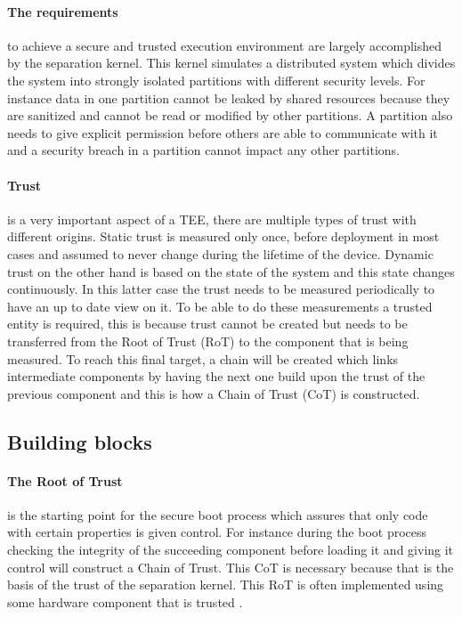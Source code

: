 \documentclass{report}
\begin{document}
\paragraph*{The requirements} 
to achieve a secure and trusted execution environment are largely accomplished by the separation kernel. This kernel simulates a distributed system which divides the system into strongly isolated partitions with different security levels. For instance data in one partition cannot be leaked by shared resources because they are sanitized and cannot be read or modified by other partitions. A partition also needs to give explicit permission before others are able to communicate with it and a security breach in a partition cannot impact any other partitions. 

\paragraph*{Trust}
is a very important aspect of a TEE, there are multiple types of trust with different origins. Static trust is measured only once, before deployment in most cases and assumed to never change during the lifetime of the device. Dynamic trust on the other hand is based on the state of the system and this state changes continuously. In this latter case the trust needs to be measured periodically to have an up to date view on it. To be able to do these measurements a trusted entity is required, this is because trust cannot be created but needs to be transferred from the Root of Trust (RoT) to the component that is being measured. To reach this final target, a chain will be created which links intermediate components by having the next one build upon the trust of the previous component and this is how a Chain of Trust (CoT) is constructed.

\subsection*{Building blocks}

\paragraph*{The Root of Trust}
is the starting point for the secure boot process which assures that only code with certain properties is given control. For instance during the boot process checking the integrity of the succeeding component before loading it and giving it control will construct a Chain of Trust. This CoT is necessary because that is the basis of the trust of the separation kernel. This RoT is often implemented using some hardware component that is trusted \cite{MATSUMOTOTsutomu2021SCUa} \cite{FotiadisGeorgios2021RAfS} \cite{2006Tpmb} \cite{ZhaoShijun2021RoRo}.
\end{document}
